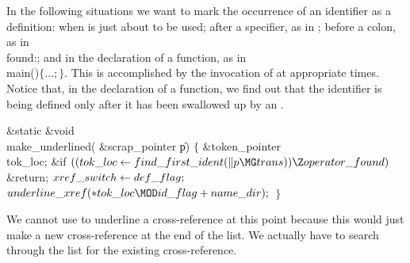 In the following situations we want to mark the occurrence of
an identifier as a definition: when  is just about to be
used; after a specifier, as in ;
before a colon, as in \\{found}:; and in the declaration of a function,
as in \\{main}()$\{\ldots;\}$.  This is accomplished by the invocation
of  at appropriate times.  Notice that, in the
declaration
of a function, we find out that the identifier is being defined only after
it has been swallowed up by an .

\Y\B\1\1\&{static} \&{void} \\{make\_underlined}(\6
\&{scrap\_pointer} \|p)\2\2\6
${}\{{}$\1\6
\&{token\_pointer} \\{tok\_loc};\7
\&{if} ${}((\\{tok\_loc}\K\\{find\_first\_ident}(\|p\MG\\{trans}))\Z\\{operator%
\_found}){}$\1\5
\&{return};\2\6
${}\\{xref\_switch}\leftarrow\\{def\_flag};{}$\6
${}\\{underline\_xref}({*}\\{tok\_loc}\MOD\\{id\_flag}+\\{name\_dir});{}$\6
\4${}\}{}$\2\par
\fi

We cannot use  to underline a cross-reference at this
point
because this would just make a new cross-reference at the end of the list.
We actually have to search through the list for the existing
cross-reference.

